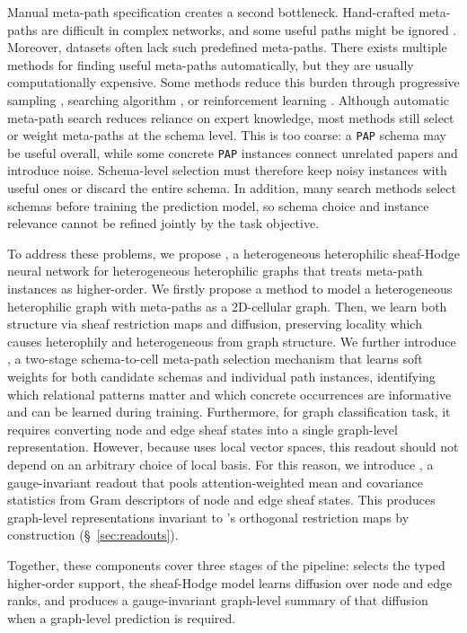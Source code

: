 Manual meta-path specification creates a second bottleneck. Hand-crafted meta-paths are difficult in complex networks, and some useful paths might be ignored \cite{zhong2022pmhgnn,li2024lmsps}. Moreover, datasets often lack such predefined meta-paths. There exists multiple methods for finding useful meta-paths automatically, but they are usually computationally expensive. Some
methods reduce this burden through progressive sampling \cite{li2024lmsps}, searching algorithm \cite{zhang2026mctshgnn,li2023pmmm,li2026amphgnas,sun2025hgsearch}, or reinforcement learning
\cite{zhong2022pmhgnn}.
Although automatic meta-path search reduces reliance on expert knowledge, most methods still select or weight meta-paths at the schema level. This is too coarse: a \texttt{PAP} schema may be useful overall, while some concrete \texttt{PAP} instances connect unrelated papers and introduce noise. Schema-level selection must therefore keep noisy instances with useful ones or discard the entire schema. In addition, many search methods select schemas before training the prediction model, so schema choice and instance relevance cannot be refined jointly by the task objective.

To address these problems, we propose \method{}, a heterogeneous heterophilic sheaf-Hodge neural network for heterogeneous heterophilic graphs that treats  meta-path instances as higher-order. We firstly propose a method to model a heterogeneous heterophilic graph with meta-paths as a 2D-cellular graph. Then, we learn both structure via sheaf restriction maps and diffusion, preserving locality which causes heterophily and heterogeneous from graph structure. We further introduce \ampss{}, a two-stage schema-to-cell meta-path selection mechanism that learns soft weights for both candidate schemas and individual path instances, identifying which relational patterns matter and which concrete occurrences are informative and can be learned during training. Furthermore, for graph classification task, it requires converting node and edge sheaf states into a single graph-level representation. However, because \method{} uses local vector spaces, this readout should not depend on an arbitrary choice of local basis. For this reason, we introduce \sheafconvpool{}, a gauge-invariant readout that pools attention-weighted mean and covariance statistics from Gram descriptors of node and edge sheaf states. This produces graph-level representations invariant to \method{}'s orthogonal restriction maps by construction (\S~\ref{sec:readouts}).

Together, these components cover three stages of the pipeline:
\ampss{} selects the typed higher-order support, the sheaf-Hodge model learns diffusion over node
and edge ranks, and \sheafconvpool{} produces a gauge-invariant graph-level summary of that
diffusion when a graph-level prediction is required.

